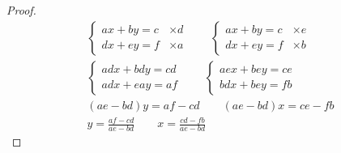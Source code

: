 \documentclass[main.tex]{subfiles}
\begin{document}
\begin{proof}\hfill 
	\begin{gather*}
		\begin{cases}
			ax + by = c & \times d  \\
			dx + ey = f & \times a 
		\end{cases}
		\qquad 
		\begin{cases}
			ax + by = c & \times e  \\
			dx + ey = f & \times b 
		\end{cases}
		\\
		\begin{cases}
			adx + bdy = cd    \\
			adx + eay = af   
		\end{cases}
		\qquad
		\begin{cases}
			aex + bey = ce  \\
			bdx + bey = fb 
		\end{cases}
		\\
		(ae-bd)y = af-cd \qquad (ae-bd)x=ce-fb\\
		y=\frac{af-cd}{ae-bd}\qquad x=\frac{cd-fb}{ae-bd} 
	\end{gather*} 
\end{proof}





\newpage 
{}  
\pagestyle{scrheadings} %
\onehalfspacing
\end{document}
